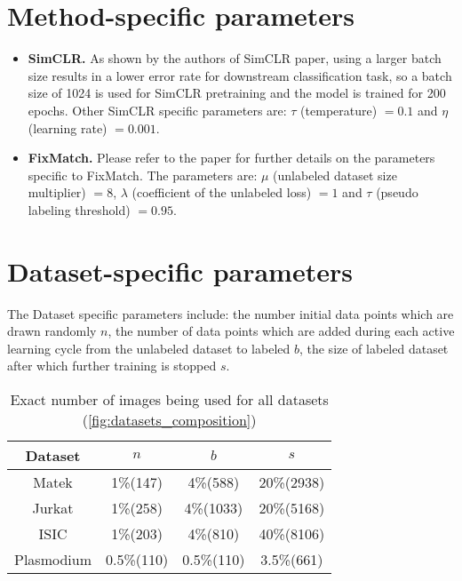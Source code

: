 \section{Method-specific parameters}\label{section:method_specific_parameters}
\begin{itemize}
  \item \textbf{SimCLR.} As shown by the authors of SimCLR paper, using a larger batch size results in a lower error rate for downstream classification task, so a batch size of 1024 is used for SimCLR pretraining and the model is trained for 200 epochs. Other SimCLR specific parameters are: $\tau$ (temperature) $= 0.1$ and $\eta$ (learning rate) $= 0.001$.
  \item \textbf{FixMatch.} Please refer to the paper for further details on the parameters specific to FixMatch. The parameters are: $\mu$ (unlabeled dataset size multiplier) $=8$, $\lambda$ (coefficient of the unlabeled loss) $=1$ and $\tau$ (pseudo labeling threshold) $=0.95$.
\end{itemize}
\section{Dataset-specific parameters}\label{section:dataset_specific_parameters}
The Dataset specific parameters include: the number initial data points which are drawn randomly $n$, the number of data points which are added during each active learning cycle from the unlabeled dataset to labeled $b$, the size of labeled dataset after which further training is stopped $s$.
\vspace{0.5cm}
\begin{table}[htbp]
\captionsetup{format=plain}
\centering
 \begin{tabular}{c c c c} 
 \hline
 Dataset & $n$ & $b$ & $s$ \\ [0.5ex] 
 \hline
 Matek & 1\%\hspace{0.35cm}(147) & 4\%\hspace{0.35cm}(588) & 20\%\hspace{0.35cm}(2938) \\ 
 Jurkat & 1\%\hspace{0.35cm}(258) & \hspace{0.20cm}4\%\hspace{0.35cm}(1033) & 20\%\hspace{0.35cm}(5168) \\
 ISIC & 1\%\hspace{0.35cm}(203) & 4\%\hspace{0.35cm}(810) & 40\%\hspace{0.35cm}(8106) \\
 Plasmodium & 0.5\%\hspace{0.125cm}(110) & 0.5\%\hspace{0.125cm}(110) & 3.5\%\hspace{0.35cm}(661) \\
 \hline
\end{tabular}
\caption{Exact number of images being used for all datasets (\ref{fig:datasets_composition})}
\label{table:datasets_splits}
\end{table}